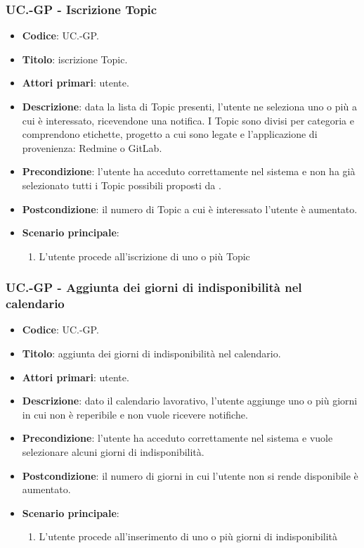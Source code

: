 	\subsubsection{UC\theuccount.\thesubuccount-GP - Iscrizione Topic}

		\begin{itemize}
			\item \textbf{Codice}: UC\theuccount.\thesubuccount-GP.
			\item \textbf{Titolo}: iscrizione Topic.
			\item \textbf{Attori primari}: utente.
			\item \textbf{Descrizione}: data la lista di Topic presenti, l’utente ne seleziona uno o	più a cui è interessato, ricevendone una notifica. I Topic sono divisi per categoria e	comprendono etichette, progetto a cui sono legate e l'applicazione di provenienza: Redmine o GitLab.
			\item \textbf{Precondizione}: l’utente ha acceduto correttamente nel sistema e non ha già selezionato tutti i Topic possibili proposti da \progetto.
			\item \textbf{Postcondizione}: il numero di Topic a cui è interessato l’utente è aumentato.
			\item \textbf{Scenario principale}:
			\begin{enumerate}
				\item L'utente procede all'iscrizione di uno o più Topic
			\end{enumerate}
		\end{itemize}
	
	\subsubsection{UC\theuccount.\thesubuccount-GP - Aggiunta dei giorni di indisponibilità nel calendario}
		
		\begin{itemize}
			\item \textbf{Codice}: UC\theuccount.\thesubuccount-GP.
			\item \textbf{Titolo}: aggiunta dei giorni di indisponibilità nel calendario.
			\item \textbf{Attori primari}: utente.
			\item \textbf{Descrizione}: dato il calendario lavorativo, l’utente aggiunge uno o più giorni in cui non è reperibile e non vuole ricevere notifiche.
			\item \textbf{Precondizione}: l’utente ha acceduto correttamente nel sistema e vuole selezionare alcuni giorni di indisponibilità.
			\item \textbf{Postcondizione}: il numero di giorni in cui l’utente non si rende disponibile è aumentato.
			\item \textbf{Scenario principale}:
			\begin{enumerate}
				\item L'utente procede all'inserimento di uno o più giorni di indisponibilità
			\end{enumerate}
		\end{itemize}
	
